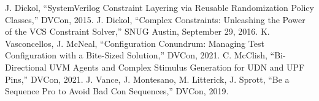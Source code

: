 \documentclass[conference,onecolumn]{IEEEtran}
\begin{document}
\begin{thebibliography}{00}
     J. Dickol, ``SystemVerilog Constraint Layering via Reusable Randomization Policy Classes,'' DVCon, 2015.
     J. Dickol, ``Complex Constraints: Unleashing the Power of the VCS Constraint Solver,'' SNUG Austin, September 29, 2016.
     K. Vasconcellos, J. McNeal, ``Configuration Conundrum: Managing Test Configuration with a Bite-Sized Solution,'' DVCon, 2021.
     C. McClish, ``Bi-Directional UVM Agents and Complex Stimulus Generation for UDN and UPF Pins,'' DVCon, 2021.
     J. Vance, J. Montesano, M. Litterick, J. Sprott, ``Be a Sequence Pro to Avoid Bad Con Sequences,'' DVCon, 2019.
\end{thebibliography}
\end{document}
